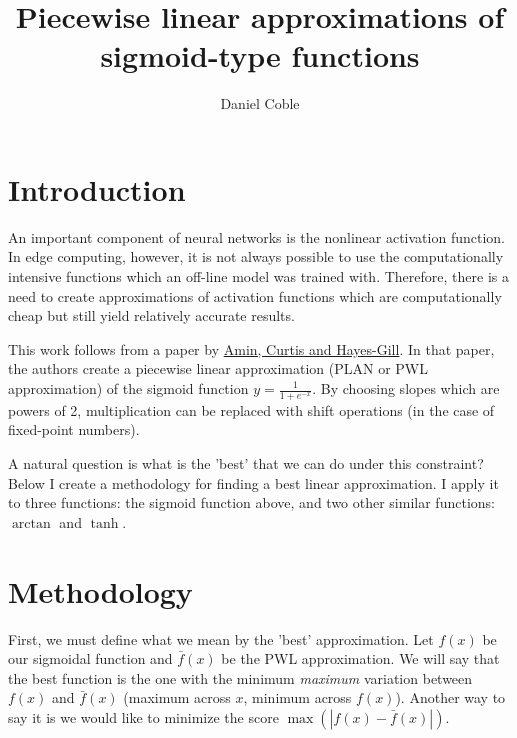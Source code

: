 \documentclass[a4paper,10pt,preprint,3p,hidelinks]{elsarticle}
\begin{document}
	
	\begin{frontmatter}
		
		\title{Piecewise linear approximations of sigmoid-type functions}
		
		\author[USC Mechanical]{Daniel Coble}
		\address[USC Mechanical]{Department of Mechanical Engineering, University of South Carolina}
		
	\end{frontmatter}
	
	
	
	\section{Introduction}
	
	An important component of neural networks is the nonlinear activation function. In edge computing, however, it is not always possible to use the computationally intensive functions which an off-line model was trained with. Therefore, there is a need to create approximations of activation functions which are computationally cheap but still yield relatively accurate results.
	
	This work follows from a paper by \hyperlink {}{Amin, Curtis and Hayes-Gill}. In that paper, the authors create a piecewise linear approximation (PLAN or PWL approximation) of the sigmoid function $y=\frac{1}{1+e^{-x}}$. By choosing slopes which are powers of 2, multiplication can be replaced with shift operations (in the case of fixed-point numbers).
	
	A natural question is what is the 'best' that we can do under this constraint? Below I create a methodology for finding a best linear approximation. I apply it to three functions: the sigmoid function above, and two other similar functions: $\arctan$ and $\tanh$. 
	
	\section{Methodology}
	
	First, we must define what we mean by the 'best' approximation. Let $f(x)$ be our sigmoidal function and $\bar{f}(x)$ be the PWL approximation. We will say that the best function is the one with the minimum {\it maximum} variation between $f(x)$ and $\bar{f}(x)$ (maximum across $x$, minimum across $f(x)$). Another way to say it is we would like to minimize the score $\max(|f(x) - \bar{f}(x)|)$.\\
	
\end{document}
